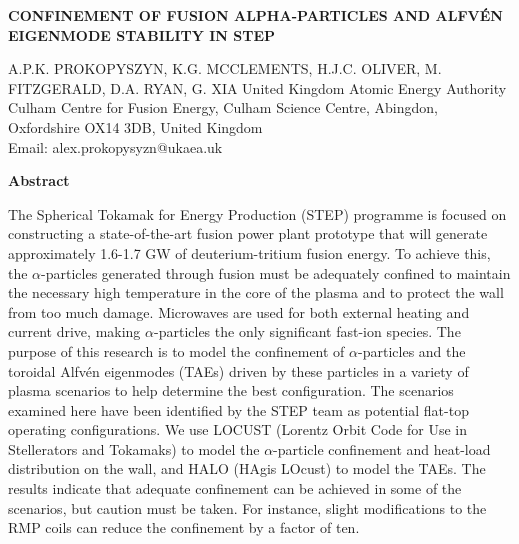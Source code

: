 \documentclass[10pt, a4paper, twoside]{article}
\begin{document}
\begin{flushleft}
\fontsize{12}{14}\selectfont \textbf{CONFINEMENT OF FUSION ALPHA-PARTICLES AND ALFV\'EN EIGENMODE STABILITY IN STEP}

\fontsize{10}{13}\selectfont
A.P.K. PROKOPYSZYN, K.G. MCCLEMENTS, H.J.C. OLIVER, M. FITZGERALD, D.A. RYAN, G. XIA
United Kingdom Atomic Energy Authority \\
Culham Centre for Fusion Energy, Culham Science Centre, Abingdon, Oxfordshire OX14 3DB, United Kingdom \\
Email: alex.prokopysyzn@ukaea.uk

\end{flushleft}

\begin{flushleft}
\textbf{Abstract}
\end{flushleft}

\setlength{\parindent}{1cm}
\fontsize{9}{12pt}\selectfont

The Spherical Tokamak for Energy Production (STEP) programme is focused on constructing a state-of-the-art fusion power plant prototype that will generate approximately 1.6-1.7 GW of deuterium-tritium fusion energy. To achieve this, the $\alpha$-particles generated through fusion must be adequately confined to maintain the necessary high temperature in the core of the plasma and to protect the wall from too much damage. Microwaves are used for both external heating and current drive, making $\alpha$-particles the only significant fast-ion species. The purpose of this research is to model the confinement of $\alpha$-particles and the toroidal Alfvén eigenmodes (TAEs) driven by these particles in a variety of plasma scenarios to help determine the best configuration. The scenarios examined here have been identified by the STEP team as potential flat-top operating configurations. We use LOCUST (Lorentz Orbit Code for Use in Stellerators and Tokamaks) to model the $\alpha$-particle confinement and heat-load distribution on the wall, and HALO (HAgis LOcust) to model the TAEs. The results indicate that adequate confinement can be achieved in some of the scenarios, but caution must be taken. For instance, slight modifications to the RMP coils can reduce the confinement by a factor of ten.

\setlength{\parindent}{0pt}
\fontsize{10}{13}\selectfont
\end{document}
